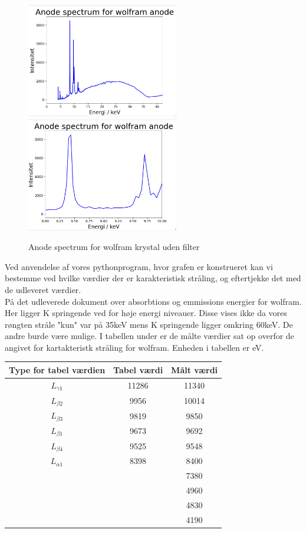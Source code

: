 \documentclass[a4paper,twoside]{article}
\begin{document}
\begin{figure}[H]
\begin{centering}
\includegraphics[height=5cm]{Wolfram krystal.png}
\includegraphics[height=5cm]{zoomed in.png}
\hspace{1cm}
\par\end{centering}
\caption{\label{cap:2ien} Anode spectrum for wolfram krystal uden filter }
\end{figure}
Ved anvendelse af vores pythonprogram, hvor grafen er konstrueret kan vi bestemme ved hvilke værdier der er karakteristisk stråling, og eftertjekke det med de udleveret værdier. 
\\ På det udleverede dokument over absorbtions og emmissions energier for wolfram. Her ligger K springende ved for høje energi niveauer. Disse vises ikke da vores røngten stråle "kun" var på 35keV mens K springende ligger omkring 60keV. De andre burde være mulige. I tabellen under er de målte værdier sat op overfor de angivet for kartakteristk stråling for wolfram. Enheden i tabellen er eV. 
\begin{center}
\begin{tabular}{||c c c ||} 
 \hline
 Type for tabel værdien & Tabel værdi & Målt værdi \\ [0.5ex] 
 \hline\hline
 $L_{\gamma1}$ & 11286 & 11340  \\ 
 \hline
  $L_{\beta2}$ & 9956 & 10014 \\ 
 \hline
$L_{\beta3}$ & 9819  & 9850  \\
 \hline
 $L_{\beta1}$ & 9673 & 9692 \\ [1ex] 
 \hline
 $L_{\beta4}$ & 9525 & 9548 \\
 \hline
 $L_{\alpha1}$ & 8398 & 8400 \\ [1ex] 
  \hline
 & & 7380 \\ [1ex] 
  \hline
 & & 4960 \\ [1ex]  
 \hline
  & & 4830 \\ [1ex] 
 \hline
  & & 4190\\ [ex] 
 \hline
\end{tabular}
\end{center}
\end{document}
